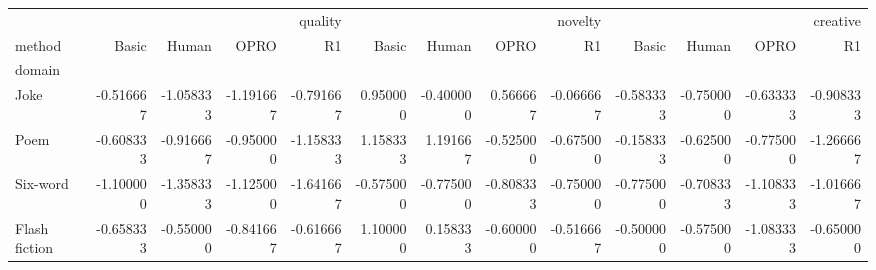 \begin{tabular}{lrrrrrrrrrrrr}
\toprule
 & \multicolumn{4}{r}{quality} & \multicolumn{4}{r}{novelty} & \multicolumn{4}{r}{creative} \\
method & Basic & Human & OPRO & R1 & Basic & Human & OPRO & R1 & Basic & Human & OPRO & R1 \\
domain &  &  &  &  &  &  &  &  &  &  &  &  \\
\midrule
Joke & -0.516667 & -1.058333 & -1.191667 & -0.791667 & 0.950000 & -0.400000 & 0.566667 & -0.066667 & -0.583333 & -0.750000 & -0.633333 & -0.908333 \\
Poem & -0.608333 & -0.916667 & -0.950000 & -1.158333 & 1.158333 & 1.191667 & -0.525000 & -0.675000 & -0.158333 & -0.625000 & -0.775000 & -1.266667 \\
Six-word & -1.100000 & -1.358333 & -1.125000 & -1.641667 & -0.575000 & -0.775000 & -0.808333 & -0.750000 & -0.775000 & -0.708333 & -1.108333 & -1.016667 \\
Flash fiction & -0.658333 & -0.550000 & -0.841667 & -0.616667 & 1.100000 & 0.158333 & -0.600000 & -0.516667 & -0.500000 & -0.575000 & -1.083333 & -0.650000 \\
\bottomrule
\end{tabular}
